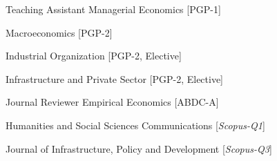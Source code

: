 
\begin{cvskills}
\cvskill
{Teaching Assistant} %
{Managerial Economics [PGP-1]}

\cvskill
{} %
{Macroeconomics [PGP-2]}

\cvskill
{} %
{Industrial Organization [PGP-2, Elective]}

\cvskill
{} %
{Infrastructure and Private Sector [PGP-2, Elective]}

\cvskill
{Journal Reviewer} %
{Empirical Economics [ABDC-A]} %

\cvskill
{} %
{Humanities and Social Sciences Communications [\textit{Scopus-Q1}]} %

\cvskill
{} %
{Journal of Infrastructure, Policy and Development [\textit{Scopus-Q3}]} %


\end{cvskills}
\relax
